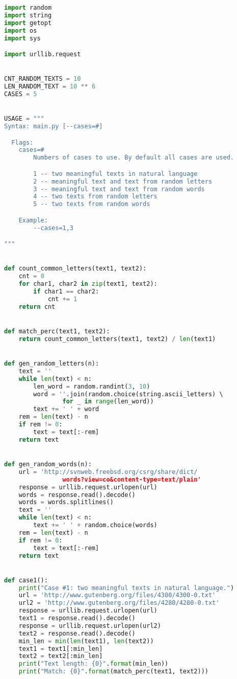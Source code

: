 \documentclass[12pt]{article}
\begin{document}
\begin{lstlisting}[language=Python]
import random
import string
import getopt
import os
import sys

import urllib.request


CNT_RANDOM_TEXTS = 10
LEN_RANDOM_TEXT = 10 ** 6
CASES = 5


USAGE = """
Syntax: main.py [--cases=#]

  Flags:
    cases=#
        Numbers of cases to use. By default all cases are used.

        1 -- two meaningful texts in natural language
        2 -- meaningful text and text from random letters
        3 -- meaningful text and text from random words
        4 -- two texts from random letters
        5 -- two texts from random words

    Example:
        --cases=1,3

"""


def count_common_letters(text1, text2):
    cnt = 0
    for char1, char2 in zip(text1, text2):
        if char1 == char2:
            cnt += 1
    return cnt


def match_perc(text1, text2):
    return count_common_letters(text1, text2) / len(text1)


def gen_random_letters(n):
    text = ''
    while len(text) < n:
        len_word = random.randint(3, 10)
        word = ''.join(random.choice(string.ascii_letters) \ 
                for _ in range(len_word))
        text += ' ' + word
    rem = len(text) - n
    if rem != 0:
        text = text[:-rem]
    return text


def gen_random_words(n):
    url = 'http://svnweb.freebsd.org/csrg/share/dict/
                words?view=co&content-type=text/plain'
    response = urllib.request.urlopen(url)
    words = response.read().decode()
    words = words.splitlines()
    text = ''
    while len(text) < n:
        text += ' ' + random.choice(words)
    rem = len(text) - n
    if rem != 0:
        text = text[:-rem]
    return text


def case1():
    print("Case #1: two meaningful texts in natural language.")
    url = 'http://www.gutenberg.org/files/4300/4300-0.txt'
    url2 = 'http://www.gutenberg.org/files/4280/4280-0.txt'
    response = urllib.request.urlopen(url)
    text1 = response.read().decode()
    response = urllib.request.urlopen(url2)
    text2 = response.read().decode()
    min_len = min(len(text1), len(text2))
    text1 = text1[:min_len]
    text2 = text2[:min_len]
    print("Text length: {0}".format(min_len))
    print("Match: {0}".format(match_perc(text1, text2)))



\end{lstlisting}
\end{document}
